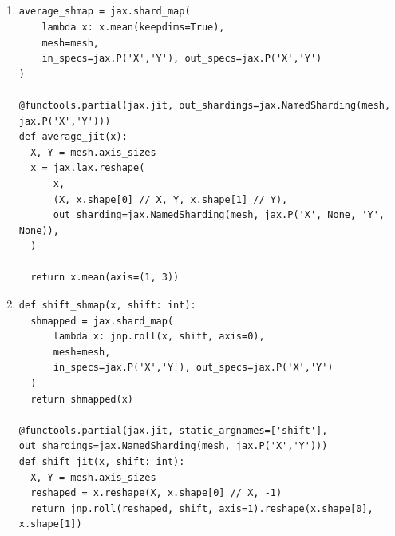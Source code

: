 \documentclass[11pt]{article}
\begin{document}
\subsection{}
\begin{enumerate}
  \item
\begin{lstlisting}[style=pythoncode]
average_shmap = jax.shard_map(
    lambda x: x.mean(keepdims=True),
    mesh=mesh,
    in_specs=jax.P('X','Y'), out_specs=jax.P('X','Y')
)

@functools.partial(jax.jit, out_shardings=jax.NamedSharding(mesh, jax.P('X','Y')))
def average_jit(x):
  X, Y = mesh.axis_sizes
  x = jax.lax.reshape(
      x,
      (X, x.shape[0] // X, Y, x.shape[1] // Y),
      out_sharding=jax.NamedSharding(mesh, jax.P('X', None, 'Y', None)),
  )

  return x.mean(axis=(1, 3))
\end{lstlisting}

  \item
\begin{lstlisting}[style=pythoncode]
def shift_shmap(x, shift: int):
  shmapped = jax.shard_map(
      lambda x: jnp.roll(x, shift, axis=0),
      mesh=mesh,
      in_specs=jax.P('X','Y'), out_specs=jax.P('X','Y')
  )
  return shmapped(x)

@functools.partial(jax.jit, static_argnames=['shift'], out_shardings=jax.NamedSharding(mesh, jax.P('X','Y')))
def shift_jit(x, shift: int):
  X, Y = mesh.axis_sizes
  reshaped = x.reshape(X, x.shape[0] // X, -1)
  return jnp.roll(reshaped, shift, axis=1).reshape(x.shape[0], x.shape[1])
\end{lstlisting}
\end{enumerate}

\clearpage
\end{document}
